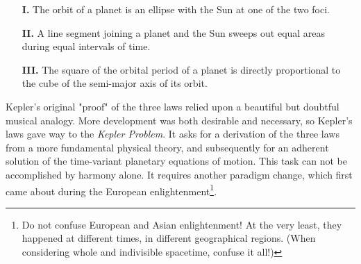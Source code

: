 \documentclass[nofootinbib,preprint]{revtex4-1}
\begin{document}
\begin{itemize}
\item[\textbf{I.} ] The orbit of a planet is an ellipse with the 
     Sun at one of the two foci.  
\item[\textbf{II.} ] A line segment joining a planet and the Sun sweeps
     out equal areas during equal intervals of time.  
\item[\textbf{III.} ] The square of the orbital period of a planet is directly
     proportional to the cube of the semi-major axis of its orbit.
\end{itemize}
Kepler's original "proof" of the three laws relied upon a beautiful but doubtful musical 
analogy. More development was both desirable and necessary, so Kepler's laws gave way to 
the \textit{Kepler Problem}. It asks for a derivation of the three laws from a more 
fundamental physical theory, and subsequently for an adherent solution of the time-variant 
planetary equations of motion. This task can not be accomplished by harmony alone. It requires 
another paradigm change, which first came about during the European enlightenment\footnote{Do 
not confuse European and Asian enlightenment! At the very least, they happened at different times, 
in different geographical regions. (When considering whole and indivisible spacetime, 
confuse it all!)}.
\end{document}
